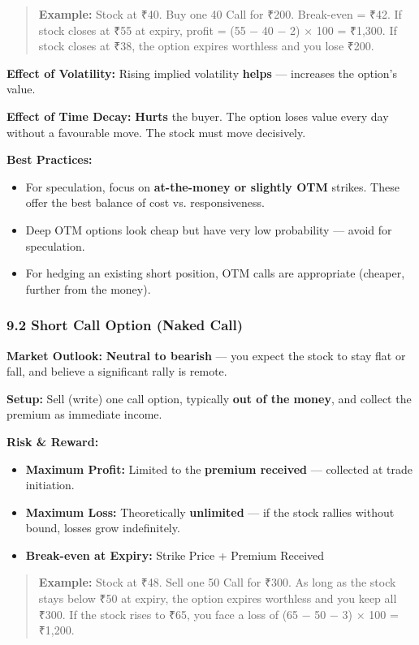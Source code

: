 \documentclass[12pt,openany]{book}
\begin{document}
\begin{quote}
\textbf{Example:} Stock at ₹40. Buy one 40 Call for ₹200. Break-even = ₹42. If stock closes at ₹55 at expiry, profit = (55 − 40 − 2) × 100 = ₹1,300. If stock closes at ₹38, the option expires worthless and you lose ₹200.
\end{quote}

\textbf{Effect of Volatility:} Rising implied volatility \textbf{helps} — increases the option's value.

\textbf{Effect of Time Decay:} \textbf{Hurts} the buyer. The option loses value every day without a favourable move. The stock must move decisively.

\textbf{Best Practices:}
\begin{itemize}[leftmargin=*]
    \item For speculation, focus on \textbf{at-the-money or slightly OTM} strikes. These offer the best balance of cost vs. responsiveness.
    \item Deep OTM options look cheap but have very low probability — avoid for speculation.
    \item For hedging an existing short position, OTM calls are appropriate (cheaper, further from the money).
\end{itemize}


\subsubsection{9.2 Short Call Option (Naked Call)}

\textbf{Market Outlook:} \textbf{Neutral to bearish} — you expect the stock to stay flat or fall, and believe a significant rally is remote.

\textbf{Setup:} Sell (write) one call option, typically \textbf{out of the money}, and collect the premium as immediate income.

\textbf{Risk \& Reward:}
\begin{itemize}[leftmargin=*]
    \item \textbf{Maximum Profit:} Limited to the \textbf{premium received} — collected at trade initiation.
    \item \textbf{Maximum Loss:} Theoretically \textbf{unlimited} — if the stock rallies without bound, losses grow indefinitely.
    \item \textbf{Break-even at Expiry:} Strike Price + Premium Received
\end{itemize}

\begin{quote}
\textbf{Example:} Stock at ₹48. Sell one 50 Call for ₹300. As long as the stock stays below ₹50 at expiry, the option expires worthless and you keep all ₹300. If the stock rises to ₹65, you face a loss of (65 − 50 − 3) × 100 = ₹1,200.
\end{quote}
\end{document}
